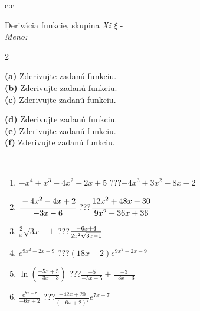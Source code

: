 \documentclass[10pt]{report}
\begin{document}
\newpage
\thispagestyle{empty}
\begin{tabular}{c:c}
\begin{minipage}[c][104.5mm][t]{0.5\linewidth}
\begin{center}
\vspace{7mm}
{\huge Derivácia funkcie, skupina \textit{Xi $\xi$} -}\\[5mm]
\textit{Meno:}\phantom{xxxxxxxxxxxxxxxxxxxxxxxxxxxxxxxxxxxxxxxxxxxxxxxxxxxxxxxxxxxxxxxxx}\\[5mm]
\begin{minipage}{0.95\linewidth}
\begin{center}
{\small \begin{multicols}{2} \raggedright
\textbf{(a)} Zderivujte zadanú funkciu. \\[1mm]
\textbf{(b)} Zderivujte zadanú funkciu. \\[1mm]
\textbf{(c)} Zderivujte zadanú funkciu. \par \columnbreak
\textbf{(d)} Zderivujte zadanú funkciu. \\[1mm]
\textbf{(e)} Zderivujte zadanú funkciu. \\[1mm]
\textbf{(f)} Zderivujte zadanú funkciu.
\end{multicols}
}
\end{center}
\end{minipage}
\\[4mm]
\begin{minipage}{0.79\linewidth}
\begin{center}
\begin{varwidth}{\linewidth}
\begin{enumerate}
\normalsize
\item $-x^4+x^3-4x^2-2x+5$\quad \dotfill\; ???\;\dotfill \quad $-4x^3+3x^2-8x-2$
\item $\cfrac{-4x^2-4x+2}{-3x-6}$\quad \dotfill\; ???\;\dotfill \quad $\cfrac{12x^2+48x+30}{9x^2+36x+36}$
\item $\frac{2}{x}\sqrt{3x-1}$\quad \dotfill\; ???\;\dotfill \quad $\frac{-6x+4}{2x^2 \sqrt{\smash[b]{3x-1}}}$
\item $e^{9x^2-2x-9}$\quad \dotfill\; ???\;\dotfill \quad $(18x-2)e^{9x^2-2x-9}$
\item $\ln{\left(\frac{-5x+5}{-3x-3}\right)}$\quad \dotfill\; ???\;\dotfill \quad $\frac{-5}{-5x+5}+\frac{-3}{-3x-3}$
\item $\frac{e^{7x+7}}{-6x+2}$\quad \dotfill\; ???\;\dotfill \quad $\frac{+42x+20}{(-6x+2)^2}e^{7x+7}$
\end{enumerate}

\end{varwidth}
\end{center}
\end{minipage}
\end{center}
\end{minipage}
\end{tabular}
\end{document}
